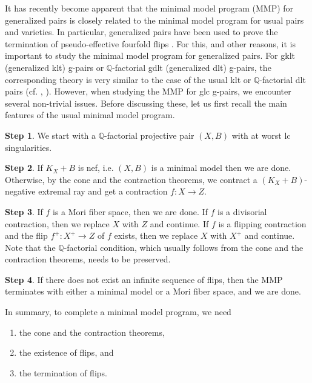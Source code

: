 \documentclass[11pt]{amsart}
\numberwithin{equation}{section}
\newcommand{\Qq}{\mathbb{Q}}
\theoremstyle{definition}
\theoremstyle{definition}
\theoremstyle{definition}
\begin{document}
It has recently become apparent that the minimal model program (MMP) for generalized pairs is closely related to the minimal model program for usual pairs and varieties. In particular, generalized pairs have been used to prove the termination of pseudo-effective fourfold flips \cite{Mor18,HL18,HM20,CT20}. For this, and other reasons, it is important to study the minimal model program for generalized pairs. For gklt (generalized klt) g-pairs or $\Qq$-factorial gdlt (generalized dlt) g-pairs, the corresponding theory is very similar to the case of the usual klt or $\Qq$-factorial dlt pairs (cf. \cite[Lemma 4.4]{BZ16}, \cite[Lemma 3.5]{HL18}). However, when studying the MMP for glc g-pairs, we encounter several non-trivial issues. Before discussing these, let us first recall the main features of the usual minimal model program. 

\medskip

\noindent\textbf{Step 1}. We start with a $\Qq$-factorial projective pair $(X,B)$ with at worst lc singularities.

\medskip

\noindent\textbf{Step 2}. If $K_X+B$ is nef, i.e. $(X,B)$ is a minimal model then we are done. Otherwise, by the cone and the contraction theorems, we contract a $(K_X+B)$-negative extremal ray and get a contraction $f: X\rightarrow Z$.

\medskip

\noindent\textbf{Step 3}. If $f$ is a Mori fiber space, then we are done. If $f$ is a divisorial contraction, then we replace $X$ with $Z$ and continue. If $f$ is a flipping contraction and the flip $f^+: X^+\rightarrow Z$ of $f$ exists, then we replace $X$ with $X^+$ and continue. Note that the $\Qq$-factorial condition, which usually follows from the cone and the contraction theorems, needs to be preserved.

\medskip

\noindent\textbf{Step 4}. If there does not exist an infinite sequence of flips, then the MMP terminates with either a minimal model or a Mori fiber space, and we are done.

\medskip

In summary, to complete a minimal model program, we need
\begin{enumerate}
    \item the cone and the contraction theorems,
    \item the existence of flips, and
    \item the termination of flips.
\end{enumerate}
\end{document}
